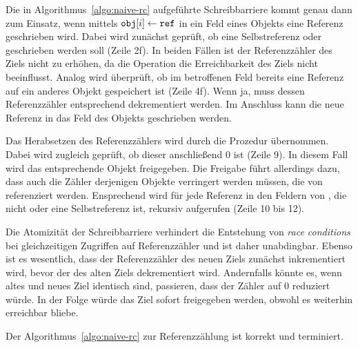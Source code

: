 Die in Algorithmus~\ref{algo:naive-rc} aufgeführte Schreibbarriere kommt genau dann zum Einsatz, wenn mittels $\texttt{obj}[i] \gets \texttt{ref}$ in ein Feld eines Objekts eine Referenz geschrieben wird.
Dabei wird zunächst geprüft, ob eine Selbstreferenz oder \Null geschrieben werden soll (Zeile 2f).
In beiden Fällen ist der Referenzzähler des Ziels nicht zu erhöhen, da die Operation die Erreichbarkeit des Ziels nicht beeinflusst.
Analog wird überprüft, ob im betroffenen Feld bereits eine Referenz auf ein anderes Objekt gespeichert ist (Zeile 4f).
Wenn ja, muss dessen Referenzzähler entsprechend dekrementiert werden.
Im Anschluss kann die neue Referenz in das Feld des Objekts geschrieben werden.

Das Herabsetzen des Referenzzählers wird durch die Prozedur  übernommen.
Dabei wird zugleich geprüft, ob dieser anschließend $0$ ist (Zeile 9).
In diesem Fall wird das entsprechende Objekt  freigegeben.
Die Freigabe führt allerdings dazu, dass auch die Zähler derjenigen Objekte verringert werden müssen, die von  referenziert werden.
Ensprechend wird für jede Referenz in den Feldern von , die nicht \Null oder eine Selbstreferenz ist,  rekursiv aufgerufen (Zeile 10 bis 12).


Die Atomizität der Schreibbarriere verhindert die Entstehung von \textit{race conditions} bei gleichzeitigen Zugriffen auf Referenzzähler und ist daher unabdingbar.
Ebenso ist es wesentlich, dass der Referenzzähler des neuen Ziels zunächst inkrementiert wird, bevor der des alten Ziels dekrementiert wird.
Andernfalls könnte es, wenn altes und neues Ziel identisch sind, passieren, dass der Zähler auf $0$ reduziert würde.
In der Folge würde das Ziel sofort freigegeben werden, obwohl es weiterhin erreichbar bliebe.

\begin{mybox}
\begin{satz}[]
\label{satz:rc-correctness}
	Der Algorithmus~\ref{algo:naive-rc} zur Referenzzählung ist korrekt und terminiert.
\end{satz}
\end{mybox}

